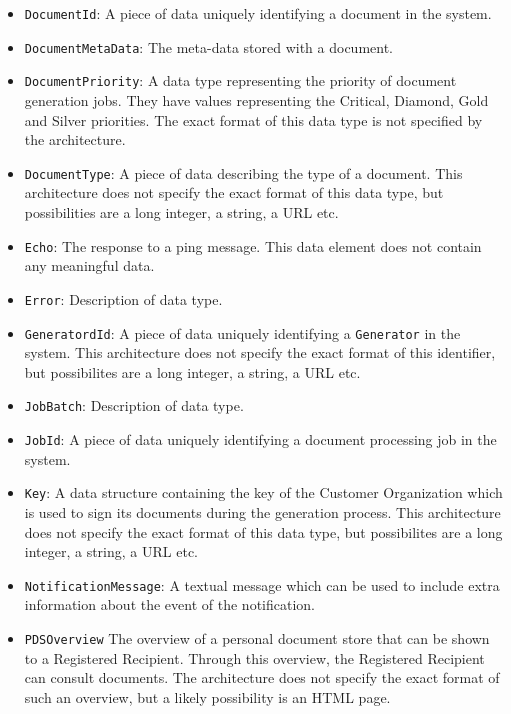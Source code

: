 \documentclass[a4paper,10pt]{article}
\begin{document}
\begin{itemize}
	\item \texttt{DocumentId}: A piece of data uniquely identifying a document in the system.

	\item \texttt{DocumentMetaData}: The meta-data stored with a document.	
	
	\item \texttt{DocumentPriority}: A data type representing the priority of document generation jobs. They have values representing the Critical, Diamond, Gold and Silver priorities. The exact format of this data type is not specified by the architecture.
	
	\item \texttt{DocumentType}: A piece of data describing the type of a document. This architecture does not specify the exact format of this data type, but possibilities are a long integer, a string, a URL etc.
	
	\item \texttt{Echo}: The response to a ping message. This data element does not contain any meaningful data.
	
	\item \texttt{Error}: Description of data type.
	
    \item \texttt{GeneratordId}: A piece of data uniquely identifying a \texttt{Generator} in the system. This architecture does not specify the exact format of this identifier, but possibilites are a long integer, a string, a URL etc.
    
    \item \texttt{JobBatch}: Description of data type.
    
    \item \texttt{JobId}: A piece of data uniquely identifying a document processing job in the system.
    
    \item \texttt{Key}: A data structure containing the key of the Customer Organization which is used to sign its documents during the generation process. This architecture does not specify the exact format of this data type, but possibilites are a long integer, a string, a URL etc.
    
    \item \texttt{NotificationMessage}: A textual message which can be used to include extra information about the event of the notification.
    
	\item \texttt{PDSOverview} The overview of a personal document store that can be shown to a Registered Recipient. Through this overview, the Registered Recipient can consult documents. The architecture does not specify the exact format of such an overview, but a likely possibility is an HTML page.
    

\end{itemize}
\end{document}
